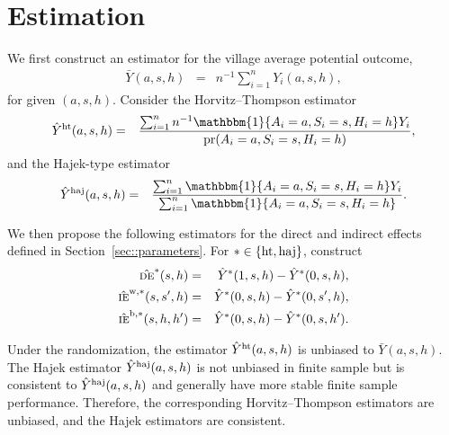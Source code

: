 \documentclass{article}
\newtheorem{remark}{Remark}[section]
\newcommand{\pr}{\textup{pr}}
\newcommand{\bZ}{\boldsymbol{Z}}
\newcommand{\bA}{\boldsymbol{A}}
\newcommand{\indicator}{\mathbbm{1}}
\newcommand{\sumi}{\sum_{i=1}^n}
\newcommand{\de}{\textsc{de}}
\newcommand{\ie}{\textsc{ie}}
\newcommand{\horthom}{\textup{ht}}
\newcommand{\haj}{\textup{haj}}
\begin{document}


\section{Estimation}
We first construct an estimator for the village average potential outcome,
\begin{eqnarray*}
    \bar{Y}(a,s,h) &=& n^{-1}\sumi Y_{i}(a,s,h),
\end{eqnarray*}
for given $(a,s,h)$. Consider the Horvitz--Thompson estimator
\begin{eqnarray*}
    \hat{Y}^{\horthom}(a,s,h) &=& \frac{\sumi n^{-1}\indicator\{A_{i}=a, S_{i}=s, H_{i}=h\} Y_{i}}{\pr(A_{i}=a, S_{i}=s, H_{i}=h)},
\end{eqnarray*}
and the Hajek-type estimator
\begin{eqnarray*}
    \hat{Y}^{\haj}(a,s,h) &=& \frac{\sumi \indicator\{A_{i}=a, S_{i}=s, H_{i}=h\} Y_{i}}{\sumi \indicator\{A_{i}=a, S_{i}=s, H_{i}=h\}}.
\end{eqnarray*}

We then propose the following estimators for the direct and indirect effects defined in Section~\ref{sec::parameters}. For $*\in\{\horthom,\haj\}$, construct
\begin{eqnarray*}
    \hat{\de}^{*}(s,h) &=& \hat{Y}^{*}(1,s,h) - \hat{Y}^{*}(0,s,h), \\
    \hat{\ie}^{\textup{w},*}(s,s^{\prime},h) &=& \hat{Y}^{*}(0,s,h) - \hat{Y}^{*}(0,s^{\prime},h), \\
    \hat{\ie}^{\textup{b},*}(s,h,h^{\prime}) &=& \hat{Y}^{*}(0,s,h) - \hat{Y}^{*}(0,s,h^{\prime}).
\end{eqnarray*}

Under the randomization, the estimator $\hat{Y}^{\horthom}(a,s,h)$ is unbiased to $\bar{Y}(a,s,h)$. The Hajek estimator $\hat{Y}^{\haj}(a,s,h)$ is not unbiased in finite sample but is consistent to $\hat{Y}^{\haj}(a,s,h)$ and generally have more stable finite sample performance. Therefore, the corresponding Horvitz--Thompson estimators are unbiased, and the Hajek estimators are consistent.
\end{document}
